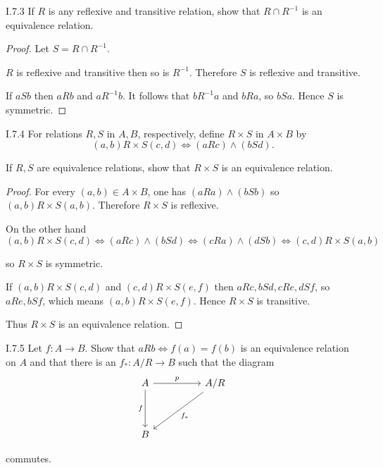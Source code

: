 \begin{problem}{I.7.3}
If \( R \) is any reflexive and transitive relation, show that \( R \cap R^{-1} \) is an equivalence relation.
\end{problem}

\begin{proof}
	Let \( S = R \cap R^{-1} \).

	\( R \) is reflexive and transitive then so is \( R^{-1} \). Therefore \( S \) is reflexive and transitive.

	If \( a S b \) then \( a R b \) and \( a R^{-1} b \). It follows that \( b R^{-1} a \) and \( b R a \), so \( b S a \). Hence \( S \) is symmetric.
\end{proof}

\begin{problem}{I.7.4}
For relations \( R, S \) in \( A, B \), respectively, define \( R\times S \) in \( A\times B \) by
\[
	(a, b) R\times S (c, d) \iff (a R c) \land (b S d).
\]

If \( R, S \) are equivalence relations, show that \( R \times S \) is an equivalence relation.
\end{problem}

\begin{proof}
	For every \( (a, b) \in A\times B \), one has \( (a R a) \land (b S b) \) so \( (a, b) R\times S (a, b) \). Therefore \( R\times S \) is reflexive.

	On the other hand
	\[
		(a, b)R\times S (c, d) \iff (aRc) \land (bSd) \iff (cRa) \land (dSb) \iff (c, d) R\times S (a, b)
	\]

	so \( R\times S \) is symmetric.

	If \( (a, b) R\times S (c, d) \) and \( (c, d) R\times S (e, f) \) then \( a R c, b S d, c R e, d S f \), so \( a R e, b S f \), which means \( (a, b) R\times S (e, f) \). Hence \( R\times S \) is transitive.

	Thus \( R\times S \) is an equivalence relation.
\end{proof}

\begin{problem}{I.7.5}\label{problem:I.7.5}
Let \( f: A \to B \). Show that \( a R b \iff f(a) = f(b) \) is an equivalence relation on \( A \) and that there is an \( f_{*}: A/R \to B \) such that the diagram
\[\begin{tikzcd}
		A && {A/R} \\
		\\
		B
		\arrow["p", from=1-1, to=1-3]
		\arrow["f"', from=1-1, to=3-1]
		\arrow["{f_{\ast}}", from=1-3, to=3-1]
	\end{tikzcd}\]

commutes.
\end{problem}

